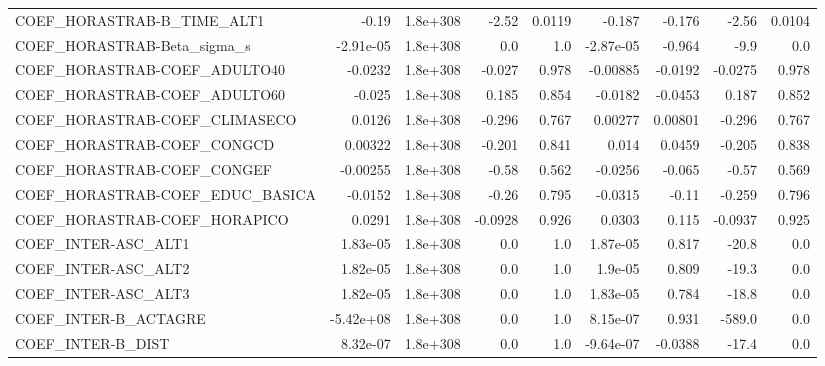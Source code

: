 \begin{tabular}{lrrrrrrrr}
COEF\_HORASTRAB-B\_TIME\_ALT1        &       -0.19 &     1.8e+308 &   -2.52 &   0.0119 &     -0.187 &      -0.176 &        -2.56 &        0.0104 \\
COEF\_HORASTRAB-Beta\_sigma\_s       &   -2.91e-05 &     1.8e+308 &     0.0 &      1.0 &  -2.87e-05 &      -0.964 &         -9.9 &           0.0 \\
COEF\_HORASTRAB-COEF\_ADULTO40      &     -0.0232 &     1.8e+308 &  -0.027 &    0.978 &   -0.00885 &     -0.0192 &      -0.0275 &         0.978 \\
COEF\_HORASTRAB-COEF\_ADULTO60      &      -0.025 &     1.8e+308 &   0.185 &    0.854 &    -0.0182 &     -0.0453 &        0.187 &         0.852 \\
COEF\_HORASTRAB-COEF\_CLIMASECO     &      0.0126 &     1.8e+308 &  -0.296 &    0.767 &    0.00277 &     0.00801 &       -0.296 &         0.767 \\
COEF\_HORASTRAB-COEF\_CONGCD        &     0.00322 &     1.8e+308 &  -0.201 &    0.841 &      0.014 &      0.0459 &       -0.205 &         0.838 \\
COEF\_HORASTRAB-COEF\_CONGEF        &    -0.00255 &     1.8e+308 &   -0.58 &    0.562 &    -0.0256 &      -0.065 &        -0.57 &         0.569 \\
COEF\_HORASTRAB-COEF\_EDUC\_BASICA   &     -0.0152 &     1.8e+308 &   -0.26 &    0.795 &    -0.0315 &       -0.11 &       -0.259 &         0.796 \\
COEF\_HORASTRAB-COEF\_HORAPICO      &      0.0291 &     1.8e+308 & -0.0928 &    0.926 &     0.0303 &       0.115 &      -0.0937 &         0.925 \\
COEF\_INTER-ASC\_ALT1               &    1.83e-05 &     1.8e+308 &     0.0 &      1.0 &   1.87e-05 &       0.817 &        -20.8 &           0.0 \\
COEF\_INTER-ASC\_ALT2               &    1.82e-05 &     1.8e+308 &     0.0 &      1.0 &    1.9e-05 &       0.809 &        -19.3 &           0.0 \\
COEF\_INTER-ASC\_ALT3               &    1.82e-05 &     1.8e+308 &     0.0 &      1.0 &   1.83e-05 &       0.784 &        -18.8 &           0.0 \\
COEF\_INTER-B\_ACTAGRE              &   -5.42e+08 &     1.8e+308 &     0.0 &      1.0 &   8.15e-07 &       0.931 &       -589.0 &           0.0 \\
COEF\_INTER-B\_DIST                 &    8.32e-07 &     1.8e+308 &     0.0 &      1.0 &  -9.64e-07 &     -0.0388 &        -17.4 &           0.0 \\

\end{tabular}
